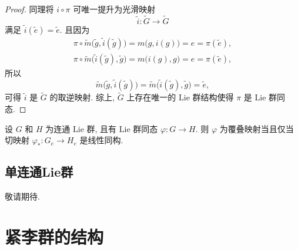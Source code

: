 \begin{proof}
        同理将 $i\circ\pi$ 可唯一提升为光滑映射 
        \begin{equation*}
            \tilde{i}:\tilde{G}\rightarrow\tilde{G}
        \end{equation*}
        满足 $\tilde{i}(\tilde{e}) = \tilde{e}$. 且因为
        \begin{gather*}
            \pi\circ\tilde{m}\big(\tilde{g},\tilde{i}(\tilde{g})\big) 
            = m\big(g,i(g)\big) = e = \pi(\tilde{e}), \\
            \pi\circ\tilde{m}\big(\tilde{i}(\tilde{g}),\tilde{g}\big) 
            = m\big(i(g),g\big) = e = \pi(\tilde{e}),
        \end{gather*}
        所以
        \begin{equation*}
            \tilde{m}\big(\tilde{g},\tilde{i}(\tilde{g})\big) 
            = \tilde{m}\big(\tilde{i}(\tilde{g}),\tilde{g}\big) 
            = \tilde{e},
        \end{equation*}
        可得 $\tilde{i}$ 是 $\tilde{G}$ 的取逆映射. 
        综上, $\tilde{G}$ 上存在唯一的 $\mathrm{Lie}$ 群结构使得 
        $\pi$ 是 $\mathrm{Lie}$ 群同态. 
    \end{proof}

    \begin{proposition}[Lie群同态与覆叠映射]
        设 $G$ 和 $H$ 为连通 $\mathrm{Lie}$ 群, 且有 $\mathrm{Lie}$ 群同态 $\varphi:G\rightarrow H$.
        则 $\varphi$ 为覆叠映射当且仅当切映射 $\varphi_*:G_e\rightarrow H_e$ 是线性同构.
    \end{proposition}

\section{单连通Lie群}
    \begin{theorem}
        敬请期待.
    \end{theorem}

\chapter{紧李群的结构}
